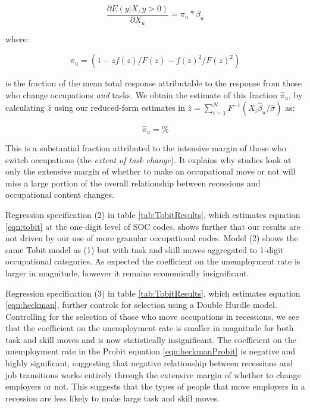 \documentclass[11pt, oneside]{article}
\begin{document}
\begin{equation}
\frac{\partial E(y|X, y>0)}{\partial X_{u}}=\pi_{u}*\beta_{u}
\end{equation}

\noindent where:

\begin{equation*}
\label{eqn:fracMeanResponse}
\pi_{u} = (1- zf( z)/F( z) - f( z)^2/F( z)^2)
\end{equation*}

\noindent  is the fraction of the mean total response attributable to the response from those who change occupations \textit{and} tasks. We obtain the estimate of this fraction $\hat{\pi}_{u}$,  by calculating $\hat{z}$ using our reduced-form estimates in $\hat{z}= \sum_{i=1}^N F^{-1}(X_i \hat{\beta}_{u}/ \hat{\sigma})$ as:

\begin{equation*}
\label{eqn:fracMeanResponseequals}
\hat{\pi}_{u} =  \%
\end{equation*}

This is a substantial fraction attributed to the intensive margin of those who switch occupations (the \textit{extent of task change}). It explains why studies look at only the extensive margin of whether to make an occupational move or not will miss a large portion of the overall relationship between recessions and occupational content changes.

\vspace{2mm}

Regression specification (2) in table \ref{tab:TobitResults}, which estimates equation \ref{eqn:tobit} at the one-digit level of SOC codes, shows further that our results are not driven by our use of more granular occupational codes. Model (2) shows the same Tobit model as (1) but with task and skill moves aggregated to 1-digit occupational categories. As expected the coefficient on the unemployment rate is larger in magnitude, however it remains economically insignificant.

\vspace{2mm}

Regression specification (3) in table \ref{tab:TobitResults}, which estimates equation \ref{eqn:heckman}, further controls for selection using a Double Hurdle model. Controlling for the selection of those who move occupations in recessions, we see that the coefficient on the unemployment rate is smaller in magnitude for both task and skill moves and is now statistically insignificant. The coefficient on the unemployment rate in the Probit equation \ref{eqn:heckmanProbit} is negative and highly significant, suggesting that negative relationship between recessions and job transitions works entirely through the extensive margin of whether to change employers or not. This suggests that the types of people that move employers in a recession are less likely to make large task and skill moves.
\end{document}

